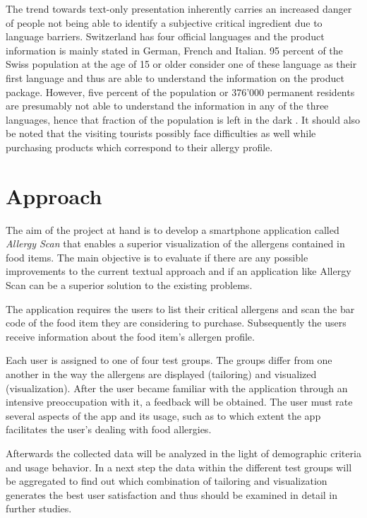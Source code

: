 The trend towards text-only presentation inherently carries an increased danger of people not being able to identify a subjective critical ingredient due to language barriers. Switzerland has four official languages and the product information is mainly stated in German, French and Italian. 95 percent of the Swiss population at the age of 15 or older consider one of these language as their first language and thus are able to understand the information on the product package. However, five percent of the population or 376’000 permanent residents are presumably not able to understand the information in any of the three languages, hence that fraction of the population is left in the dark \citep{Languages}. It should also be noted that the visiting tourists possibly face difficulties as well while purchasing products which correspond to their allergy profile.


\section{Approach}

The aim of the project at hand is to develop a smartphone application called \emph{Allergy Scan} that enables a superior visualization of the allergens contained in food items. The main objective is to evaluate if there are any possible improvements to the current textual approach and if an application like Allergy Scan can be a superior solution to the existing problems.

The application requires the users to list their critical allergens and scan the bar code of the food item they are considering to purchase. Subsequently the users receive information about the food item’s allergen profile.

Each user is assigned to one of four test groups. The groups differ from one another in the way the allergens are displayed (tailoring) and visualized (visualization). After the user became familiar with the application through an intensive preoccupation with it, a feedback will be obtained. The user must rate several aspects of the app and its usage, such as to which extent the app facilitates the user’s dealing with food allergies.

Afterwards the collected data will be analyzed in the light of demographic criteria and usage behavior. In a next step the data within the different test groups will be aggregated to find out which combination of tailoring and visualization generates the best user satisfaction and thus should be examined in detail in further studies.
